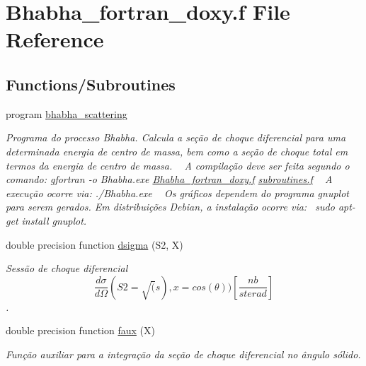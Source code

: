 \hypertarget{Bhabha__fortran__doxy_8f}{}\section{Bhabha\+\_\+fortran\+\_\+doxy.\+f File Reference}
\label{Bhabha__fortran__doxy_8f}
\subsection*{Functions/\+Subroutines}
\begin{DoxyCompactItemize}
\item 
program \hyperlink{Bhabha__fortran__doxy_8f_abb2a1b5ba16400d3f12a537f03a70349}{bhabha\+\_\+scattering}
\begin{DoxyCompactList}\small\item\em Programa do processo Bhabha. Calcula a seção de choque diferencial para uma determinada energia de centro de massa, bem como a seção de choque total em termos da energia de centro de massa. ~\newline
 A compilação deve ser feita segundo o comando\+: gfortran -\/o Bhabha.\+exe \hyperlink{Bhabha__fortran__doxy_8f}{Bhabha\+\_\+fortran\+\_\+doxy.\+f} \hyperlink{subroutines_8f}{subroutines.\+f} ~\newline
 A execução ocorre via\+: ./\+Bhabha.exe ~\newline
 Os gráficos dependem do programa gnuplot para serem gerados. Em distribuições Debian, a instalação ocorre via\+:~\newline
 sudo apt-\/get install gnuplot. \end{DoxyCompactList}\item 
double precision function \hyperlink{Bhabha__fortran__doxy_8f_adb615d7a4a2665478c9f228d3281159e}{dsigma} (S2, X)
\begin{DoxyCompactList}\small\item\em Sessão de choque diferencial \[ \frac{d\sigma}{d\Omega}(S2= \sqrt(s),x = cos(\theta))[\frac{nb}{sterad}] \]. \end{DoxyCompactList}\item 
double precision function \hyperlink{Bhabha__fortran__doxy_8f_a6ccd416a98c419022d77a6fc40b55868}{faux} (X)
\begin{DoxyCompactList}\small\item\em Função auxiliar para a integração da seção de choque diferencial no ângulo sólido. \end{DoxyCompactList}\item 

\end{DoxyCompactItemize}
